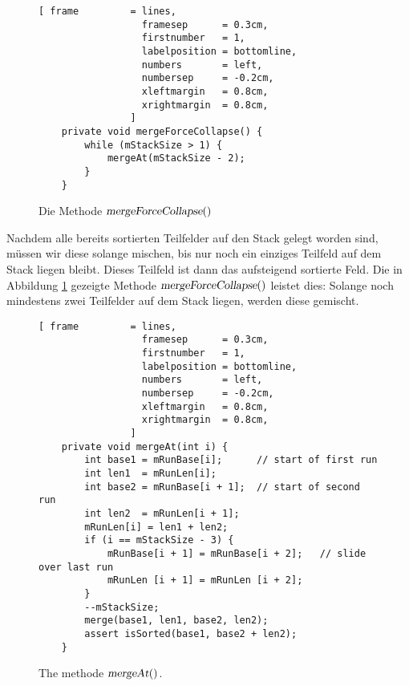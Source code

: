 \begin{figure}[!ht]
\centering
\begin{Verbatim}[ frame         = lines, 
                  framesep      = 0.3cm, 
                  firstnumber   = 1,
                  labelposition = bottomline,
                  numbers       = left,
                  numbersep     = -0.2cm,
                  xleftmargin   = 0.8cm,
                  xrightmargin  = 0.8cm,
                ]
    private void mergeForceCollapse() {
        while (mStackSize > 1) {
            mergeAt(mStackSize - 2);
        }
    }
\end{Verbatim}
\vspace*{-0.3cm}
\caption{Die Methode $\textsl{mergeForceCollapse}()$}
\label{fig:TimSort.java:mergeForceCollapse}
\end{figure}

Nachdem alle bereits sortierten Teilfelder auf den Stack gelegt worden sind, m\"ussen wir diese
solange mischen, bis nur noch ein einziges Teilfeld auf dem Stack liegen bleibt.  Dieses Teilfeld
ist dann das aufsteigend sortierte Feld.  Die in Abbildung \ref{fig:TimSort.java:mergeForceCollapse}
gezeigte Methode $\textsl{mergeForceCollapse}()$ leistet dies: Solange noch mindestens zwei
Teilfelder auf dem Stack liegen, werden diese gemischt.  

\begin{figure}[!ht]
\centering
\begin{Verbatim}[ frame         = lines, 
                  framesep      = 0.3cm, 
                  firstnumber   = 1,
                  labelposition = bottomline,
                  numbers       = left,
                  numbersep     = -0.2cm,
                  xleftmargin   = 0.8cm,
                  xrightmargin  = 0.8cm,
                ]
    private void mergeAt(int i) {
        int base1 = mRunBase[i];      // start of first run
        int len1  = mRunLen[i];
        int base2 = mRunBase[i + 1];  // start of second run
        int len2  = mRunLen[i + 1];
        mRunLen[i] = len1 + len2;
        if (i == mStackSize - 3) {
            mRunBase[i + 1] = mRunBase[i + 2];   // slide over last run
            mRunLen [i + 1] = mRunLen [i + 2];    
        }
        --mStackSize;
        merge(base1, len1, base2, len2);
        assert isSorted(base1, base2 + len2);
    }
\end{Verbatim}
\vspace*{-0.3cm}
\caption{The methode $\textsl{mergeAt}()$.}
\label{fig:TimSort.java:mergeAt}
\end{figure}

